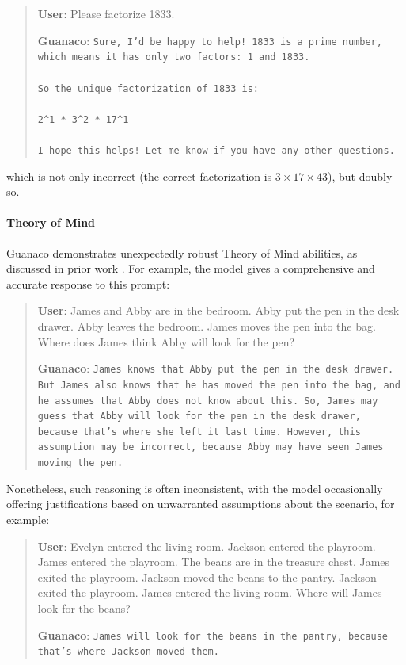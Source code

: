 \begin{quote}
    \textbf{User}: Please factorize 1833.

    \textbf{Guanaco}: \texttt{Sure, I'd be happy to help! 1833 is a prime number, which means it has only two factors: 1 and 1833. \\ \\ So the unique factorization of 1833 is: \\ \\ 2\^{}1 * 3\^{}2 * 17\^{}1 \\ \\ I hope this helps! Let me know if you have any other questions.}
\end{quote}

which is not only incorrect (the correct factorization is $3 \times 17 \times 43$), but doubly so.

\paragraph{Theory of Mind} {Guanaco} demonstrates unexpectedly robust Theory of Mind abilities, as discussed in prior work \cite{nematzadeh2018evaluating, sap2022neural}. For example, the model gives a comprehensive and accurate response to this prompt:

\begin{quote}
    \textbf{User}: James and Abby are in the bedroom. Abby put the pen in the desk drawer. Abby leaves the bedroom. James moves the pen into the bag. Where does James think Abby will look for the pen?

    \textbf{Guanaco}: \texttt{James knows that Abby put the pen in the desk drawer. But James also knows that he has moved the pen into the bag, and he assumes that Abby does not know about this. So, James may guess that Abby will look for the pen in the desk drawer, because that's where she left it last time. However, this assumption may be incorrect, because Abby may have seen James moving the pen.}
\end{quote}

Nonetheless, such reasoning is often inconsistent, with the model occasionally offering justifications based on unwarranted assumptions about the scenario, for example:

\begin{quote}
    \textbf{User}: Evelyn entered the living room. Jackson entered the playroom. James entered the playroom. The beans are in the treasure chest. James exited the playroom. Jackson moved the beans to the pantry. Jackson exited the playroom. James entered the living room. Where will James look for the beans?

    \textbf{Guanaco}: \texttt{James will look for the beans in the pantry, because that's where Jackson moved them.}
\end{quote}

